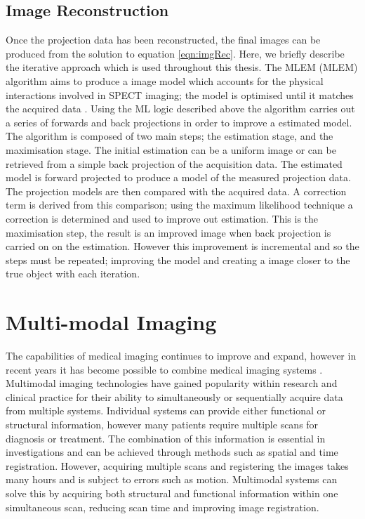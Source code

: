 \subsection{Image Reconstruction}
Once the projection data has been reconstructed, the final images can be produced from the solution to equation \ref{eqn:imgRec}. Here, we briefly describe the iterative approach which is used throughout this thesis. The \acrlong{MLEM} (\acrshort{MLEM}) algorithm aims to produce a image model which accounts for the physical interactions involved in \acrshort{SPECT} imaging; the model is optimised until it matches the acquired data \cite{4307558}. Using the \acrshort{ML} logic described above the algorithm carries out a series of forwards and back projections in order to improve a estimated model. The algorithm is composed of two main steps; the estimation stage, and the maximisation stage. The initial estimation can be a uniform image or can be retrieved from a simple back projection of the acquisition data. The estimated model is forward projected to produce a model of the measured projection data. The projection models are then compared with the acquired data. A correction term is derived from this comparison; using the maximum likelihood technique a correction is determined and used to improve out estimation. This is the maximisation step, the result is an improved image when back projection is carried on on the estimation. However this improvement is incremental and so the steps must be repeated; improving the model and creating a image closer to the true object with each iteration.  


\section{Multi-modal Imaging} %
The capabilities of medical imaging continues to improve and expand, however in recent years it has become possible to combine medical imaging systems \cite{PATTON2009247}. Multimodal imaging technologies have gained popularity within research and clinical practice for their ability to simultaneously or sequentially acquire data from multiple systems. Individual systems can provide either functional or structural information, however many patients require multiple scans for diagnosis or treatment. The combination of this information is essential in investigations and can be achieved through methods such as spatial and time registration. However, acquiring multiple scans and registering the images takes many hours and is subject to errors such as motion. Multimodal systems can solve this by acquiring both structural and functional information within one simultaneous scan, reducing scan time and improving image registration. 

